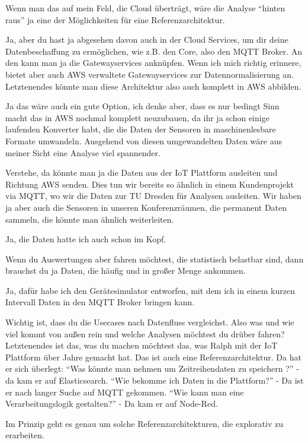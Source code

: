 \LF Wenn man das auf mein Feld, die Cloud überträgt, wäre die Analyse \enquote{hinten raus} ja eine der Möglichkeiten für eine Referenzarchitektur.

\PE Ja, aber du hast ja abgesehen davon auch in der Cloud Services, um dir deine Datenbeschaffung zu ermöglichen, wie z.B. den \AWSIOT Core, also den \ac{MQTT} Broker. An den kann man ja die Gatewayservices anknüpfen. Wenn ich mich richtig erinnere, bietet aber auch \ac{AWS} verwaltete Gatewayservices zur Datennormalisierung an. Letztenendes könnte man diese Architektur also auch komplett in \ac{AWS} abbilden.

\LF Ja das wäre auch ein gute Option, ich denke aber, dass es nur bedingt Sinn macht das in \ac{AWS} nochmal komplett neuzubauen, da ihr ja schon einige laufenden Konverter habt, die die Daten der Sensoren in maschinenlesbare Formate umwandeln. Ausgehend von diesen umgewandelten Daten wäre aus meiner Sicht eine Analyse viel spannender.

\PE Verstehe, da könnte man ja die Daten aus der IoT Plattform ausleiten und Richtung \ac{AWS} senden. Dies tun wir bereits so ähnlich in einem Kundenprojekt via \ac{MQTT}, wo wir die Daten zur TU Dresden für Analysen ausleiten. Wir haben ja aber auch die \coo{} Sensoren in unseren Konferenzräumen, die permanent Daten sammeln, die könnte man ähnlich weiterleiten.

\LF Ja, die \coo Daten hatte ich auch schon im Kopf.

\PE Wenn du Auswertungen aber fahren möchtest, die statistisch belastbar sind, dann brauchst du ja Daten, die häufig und in großer Menge ankommen.

\LF Ja, dafür habe ich den Gerätesimulator entworfen, mit dem ich in einem kurzen Intervall Daten in den \ac{MQTT} Broker bringen kann. 

\PE Wichtig ist, dass du die Usecases nach Datenfluss vergleichst. Also was und wie viel kommt von außen rein und welche Analysen möchtest du drüber fahren? Letztenendes ist das, was du machen möchtest das, was Ralph mit der \ac{IoT} Plattform über Jahre gemacht hat. Das ist auch eine Referenzarchitektur. Da hat er sich überlegt: \enquote{Was könnte man nehmen um Zeitreihendaten zu speichern ?} - da kam er auf Elasticsearch. \enquote{Wie bekomme ich Daten in die Plattform?} - Da ist er nach langer Suche auf \ac{MQTT} gekommen. \enquote{Wie kann man eine Verarbeitungslogik gestalten?} - Da kam er auf Node-Red.

\LF Im Prinzip geht es genau um solche Referenzarchitekturen, die explorativ zu erarbeiten. 

